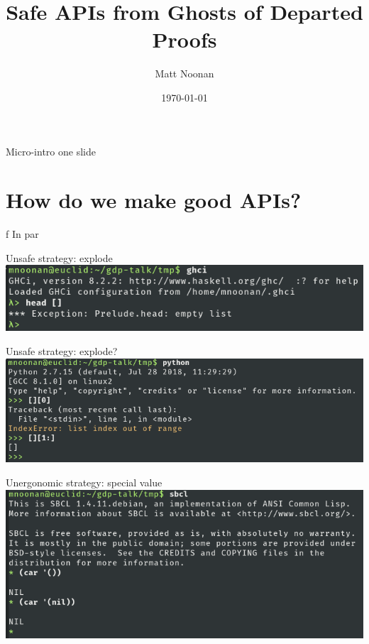 \documentclass{beamer}
\title{Safe APIs from Ghosts of Departed Proofs}
\date{\today}
\author{Matt Noonan}
\institute{Kataskeue LLC \& Input Output HK}
\begin{document}
\maketitle

\usebackgroundtemplate{}

\begin{frame}{Micro-intro}
  one slide
\end{frame}

  \section{How do we make good APIs?}   %

  \begin{frame}f
    In par
\end{frame}
  
\begin{frame}{Unsafe strategy: explode}
  \includegraphics[width=0.8\paperwidth]{hsout}
\end{frame}

\begin{frame}{Unsafe strategy: explode?}
  \includegraphics[width=0.8\paperwidth]{pyout}
\end{frame}

\begin{frame}{Unergonomic strategy: special value}
  \includegraphics[width=0.8\paperwidth]{lispout}
\end{frame}
\end{document}
